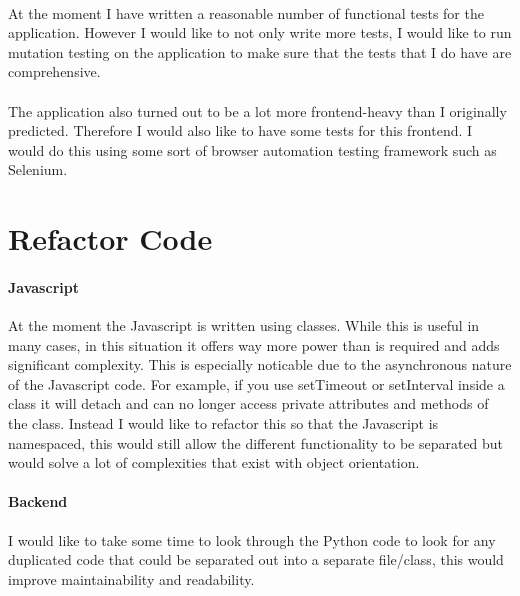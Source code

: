 \documentclass[10pt]{report}
\begin{document}
    \paragraph{}
    At the moment I have written a reasonable number of functional tests for the application.  However I
    would like to not only write more tests, I would like to run mutation testing on the application to
    make sure that the tests that I do have are comprehensive.
    
    \paragraph{}
    The application also turned out to be a lot more frontend-heavy than I originally predicted. Therefore
    I would also like to have some tests for this frontend.  I would do this using some sort of browser
    automation testing framework such as Selenium.
    
    \section*{Refactor Code}
    \paragraph{Javascript}
    At the moment the Javascript is written using classes.  While this is useful in many
    cases, in this situation it offers way more power than is required and adds significant complexity.
    This is especially noticable due to the asynchronous nature of the Javascript code.  For example, if
    you use setTimeout or setInterval inside a class it will detach and can no longer access private
    attributes and methods of the class. Instead I would like to refactor this so that the Javascript is
    namespaced, this would still allow the different functionality to be separated but would solve a lot
    of complexities that exist with object orientation.
    
    \paragraph{Backend}
    I would like to take some time to look through the Python code to look for any duplicated code that
    could be separated out into a separate file/class, this would improve maintainability and readability.
\end{document}
